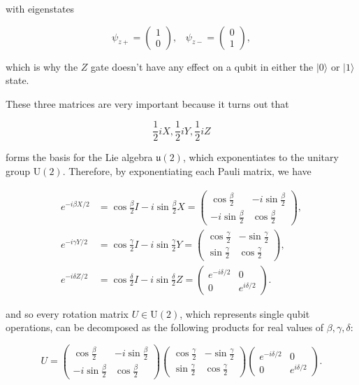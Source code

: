 \documentclass{article}
\theoremstyle{definition}
\begin{document}
\begin{enumerate}
        with eigenstates

          \[\psi_{z+} = \begin{pmatrix} 1 \\ 0 \end{pmatrix}, \;\;\; \psi_{z-} = \begin{pmatrix} 0 \\ 1 \end{pmatrix},\]

        which is why the $Z$ gate doesn't have any effect on a qubit in either the $|0\rangle$ or $|1\rangle$ state.
    \end{enumerate}

    These three matrices are very important because it turns out that

      \[\frac{1}{2} i X, \frac{1}{2} i Y, \frac{1}{2} i Z\]

    forms the basis for the Lie algebra $\mathfrak{u}(2)$, which exponentiates to the unitary group $\text{U}(2)$. Therefore, by exponentiating each Pauli matrix, we have

    \begin{align*}
      e^{-i \beta X /2} &= \cos \frac{\beta}{2} I - i \sin \frac{\beta}{2} X = \begin{pmatrix} \cos \frac{\beta}{2} & -i \sin \frac{\beta}{2} \\ -i \sin \frac{\beta}{2} & \cos \frac{\beta}{2} \end{pmatrix}, \\
      e^{-i \gamma Y/2} &= \cos \frac{\gamma}{2} I - i \sin \frac{\gamma}{2} Y = \begin{pmatrix} \cos \frac{\gamma}{2} & - \sin \frac{\gamma}{2} \\ \sin \frac{\gamma}{2} & \cos \frac{\gamma}{2} \end{pmatrix}, \\
      e^{-i \delta Z/2} &= \cos \frac{\delta}{2} I - i \sin \frac{\delta}{2} Z = \begin{pmatrix} e^{-i \delta /2} & 0 \\ 0 & e^{i\delta/2} \end{pmatrix}.
    \end{align*}

    and so every rotation matrix $U \in \text{U}(2)$, which represents single qubit operations, can be decomposed as the following products for real values of $\beta, \gamma, \delta$:

    \[
      U = \begin{pmatrix} \cos \frac{\beta}{2} & -i \sin \frac{\beta}{2} \\ -i \sin \frac{\beta}{2} & \cos \frac{\beta}{2} \end{pmatrix} \begin{pmatrix} \cos \frac{\gamma}{2} & - \sin \frac{\gamma}{2} \\ \sin \frac{\gamma}{2} & \cos \frac{\gamma}{2} \end{pmatrix} \begin{pmatrix} e^{-i \delta /2} & 0 \\ 0 & e^{i\delta/2} \end{pmatrix}.
    \]
\end{document}
